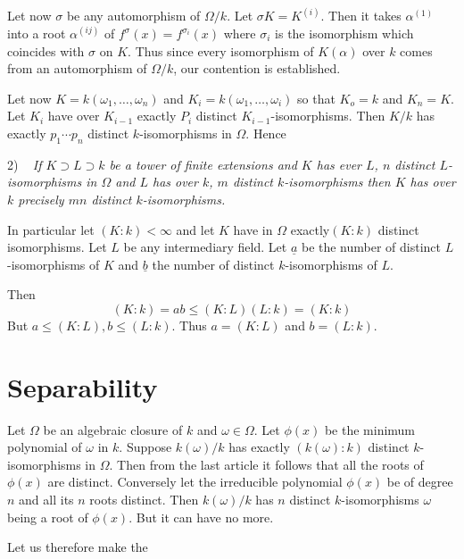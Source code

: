 Let now $\sigma$ be any automorphism of $\Omega /k$. Let $\sigma K =
K^{(i)}$. Then it takes $\alpha^{(1)}$ into a root $\alpha^{(ij)}$ of
$f^\sigma (x) = f^{\sigma_i} (x)$ where $\sigma_i$ is the isomorphism
which coincides with $\sigma$ on $K$. Thus since every isomorphism of
$K(\alpha)$ over $k$ comes from an automorphism of $\Omega/k$, our
contention is established.  


Let now $K= k(\omega_1 , \ldots , \omega_n)$ and $K_i = k (\omega_1 ,
\ldots , \omega_i)$ so that $K_o= k$ and $K_n= K$. Let $K_i$ have over
$K_{i-1}$ exactly $P_i$ distinct $K_{i-1}$-isomor\-phisms. Then $K/k$
has exactly $p_1 \cdots p_n$ distinct $k$-isomorphisms in
$\Omega$. Hence  

2) ~\textit{ If $K \supset L \supset k$ be a tower of finite
  extensions and $K$ has ever $L$, $n$ distinct $L$-isomorphisms in
  $\Omega$ and $L$ has over $k$, $m$ distinct $k$-isomor\-phisms then $K$
  has over $k$ precisely $mn$ distinct $k$-isomorphisms.} 

In particular let $(K : k) < \infty$ and let $K$ have in $\Omega$
exactly\pageoriginale $(K : k)$ distinct isomorphisms. Let $L$ be any
intermediary field. Let $\underline{a}$ be the number of distinct
$L$-isomorphisms of $K$ and $\underline{b}$ the number of distinct
$k$-isomorphisms of $L$.   

Then
$$
(K : k) = ab \leq (K : L) (L : k) = (K : k)
$$
But $a \leq (K : L), b \leq (L : k)$. Thus $a = (K : L)$ and $b = (L
:k)$. 


\section{Separability}\label{c2:s4} %

Let $\Omega$ be an algebraic closure of $k$ and $ \omega \in
\Omega$. Let $\phi (x)$ be the minimum polynomial of $\omega$ in
$k$. Suppose $k (\omega)/k$ has exactly $(k (\omega ) : k)$ distinct
$k$-isomorphisms in $\Omega$. Then from the last article it follows that
all the roots of $\phi (x)$ are distinct. Conversely let the
irreducible polynomial $\phi (x)$ be of degree $n$ and all its $n$
roots distinct. Then $k(\omega)/k$ has $n$ distinct $k$-isomorphisms
$\omega$ being a root of $\phi (x)$. But it can have no more. 

Let us therefore make the 

